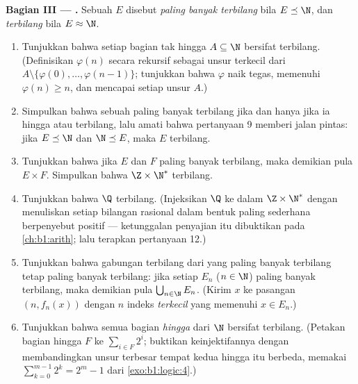 \begin{problem}
\medskip
\noindent\textbf{Bagian III --- .} Sebuah 
$E$ disebut \emph{paling banyak terbilang} bila $E \preceq \N$, dan
\emph{terbilang} bila $E \approx \N$.
\begin{enumerate}[resume]
  \item Tunjukkan bahwa setiap  bagian tak hingga
        $A \subseteq \N$ bersifat terbilang. (Definisikan $\varphi(n)$
        secara rekursif sebagai unsur terkecil dari
        $A \setminus \{\varphi(0), \dots,
        \varphi(n-1)\}$; tunjukkan bahwa $\varphi$ naik tegas,
        memenuhi $\varphi(n) \geq n$, dan mencapai setiap unsur
        $A$.)
  \item Simpulkan bahwa sebuah  paling banyak terbilang jika
        dan hanya jika ia hingga atau terbilang, lalu amati bahwa
        pertanyaan 9 memberi jalan pintas: jika $E \preceq \N$ dan
        $\N \preceq E$, maka $E$ terbilang.
  \item Tunjukkan bahwa jika $E$ dan $F$ paling banyak terbilang, maka
        demikian pula $E
        \times F$. Simpulkan bahwa $\Z \times \N^*$ terbilang.
  \item Tunjukkan bahwa $\Q$ terbilang. (Injeksikan $\Q$ ke dalam
        $\Z \times
        \N^*$ dengan menuliskan setiap bilangan rasional dalam bentuk
        paling sederhana berpenyebut positif --- ketunggalan penyajian
        itu dibuktikan pada \cref{ch:b1:arith}; lalu terapkan
        pertanyaan 12.)
  \item Tunjukkan bahwa gabungan terbilang dari  yang paling
        banyak terbilang tetap paling banyak terbilang: jika setiap
        $E_n$ ($n \in \N$) paling banyak terbilang, maka demikian pula
        $\bigcup_{n \in \N} E_n$. (Kirim $x$ ke pasangan
        $(n, f_n(x))$ dengan $n$ indeks \emph{terkecil} yang memenuhi
        $x \in E_n$.)
  \item Tunjukkan bahwa  semua  bagian \emph{hingga}
        dari $\N$ bersifat terbilang. (Petakan  bagian hingga
        $F$ ke $\sum_{i \in F} 2^i$;
        buktikan keinjektifannya dengan membandingkan unsur terbesar
        tempat kedua  hingga itu berbeda, memakai
        $\sum_{k=0}^{m-1} 2^k = 2^m - 1$
        dari \cref{exo:b1:logic:4}.)
\end{enumerate}


\end{problem}
